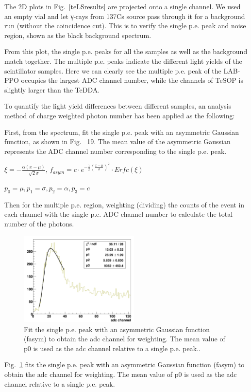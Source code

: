 The 2D plots in Fig.~\ref{teLSresults} are projected onto a single channel. We used an empty vial and let γ-rays from 137Cs source pass through it for a background run (without the coincidence cut). This is to verify the single p.e. peak and noise region, shown as the black background spectrum.

From this plot, the single p.e. peaks for all the samples as well as the background match together. The multiple p.e. peaks indicate the different light yields of the scintillator samples. Here we can clearly see the multiple p.e. peak of the LAB-PPO occupies the largest ADC channel number, while the channels of TeSOP is slightly larger than the TeDDA. 

To quantify the light yield differences between different samples, an analysis method of charge weighted photon number has been applied as the following:

First, from the spectrum, fit the single p.e. peak with an asymmetric Gaussian function, as shown in Fig.~ 19. The mean value of the asymmetric Gaussian represents the ADC channel number corresponding to the single p.e. peak.

$\xi=-\frac{\alpha(x-\mu)}{\sqrt 2\sigma}$,
$f_{asym}=c\cdot e^{-\frac{1}{2}(\frac{x-\mu}{\sigma})^2}\cdot Erfc(\xi)$

$p_0=\mu,p_1=\sigma,p_2=\alpha, p_3=c$ 

Then for the multiple p.e. region, weighting (dividing) the counts of the event in each channel with the single p.e. ADC channel number to calculate the total number of the photons.

\begin{figure}[htbp]
	\centering	
	\includegraphics[width=6cm]{fitSinglePE.png}
	\caption{Fit the single p.e. peak with an asymmetric Gaussian function (fasym) to obtain the adc channel for weighting. The mean value of p0 is used as the adc channel relative to a single p.e. peak..}
	\label{fitSinglePE}
\end{figure}

Fig.~\ref{fitSinglePE} fits the single p.e. peak with an asymmetric Gaussian function (fasym) to obtain the adc channel for weighting. The mean value of p0 is used as the adc channel relative to a single p.e. peak.

